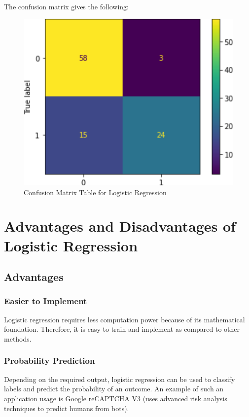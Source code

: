 \documentclass[conference]{IEEEtran}
\begin{document}
The confusion matrix gives the following:\\
\begin{figure}[h]
    \centering
    \includegraphics[scale=0.47]{figs/PredictL.png}
    \caption{Confusion Matrix Table for Logistic Regression}
    \label{dabc}        
\end{figure}

\section{Advantages and Disadvantages of Logistic Regression}
\subsection{Advantages}

\subsubsection{Easier to Implement}
Logistic regression requires less computation power because of its mathematical foundation. Therefore, it is easy to train and implement as compared to other methods.

\subsubsection{Probability Prediction}
Depending on the required output, logistic regression can be used to classify labels and predict the probability of an outcome. An example of such an application usage is Google reCAPTCHA V3 (uses advanced risk analysis techniques to predict humans from bots\cite{cc6}).
\end{document}

